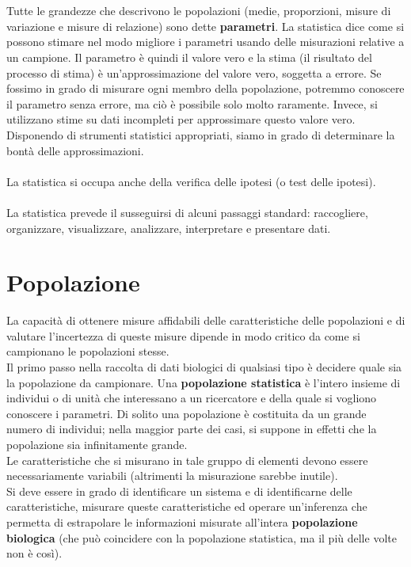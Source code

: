 \documentclass[10pt, draft]{book}
\begin{document}
\\
\\
Tutte le grandezze che descrivono le popolazioni (medie, proporzioni, misure di variazione e misure di relazione) sono dette \textbf{parametri}. La statistica dice come si possono stimare nel modo migliore i parametri usando delle misurazioni relative a un campione. Il parametro è quindi il valore vero e la stima (il risultato del processo di stima) è un'approssimazione del valore vero, soggetta a errore. Se fossimo in grado di misurare ogni membro della popolazione, potremmo conoscere il parametro senza errore, ma ciò è possibile solo molto raramente. Invece, si utilizzano stime su dati incompleti per approssimare questo valore vero. Disponendo di strumenti statistici appropriati, siamo in grado di determinare la bontà delle approssimazioni.
\\
\\
La statistica si occupa anche della verifica delle ipotesi (o test delle ipotesi).
\\
\\
La statistica prevede il susseguirsi di alcuni passaggi standard: raccogliere, organizzare, visualizzare, analizzare, interpretare e presentare dati.

\section{Popolazione}
La capacità di ottenere misure affidabili delle caratteristiche delle popolazioni e di valutare l'incertezza di queste misure dipende in modo critico da come si campionano le popolazioni stesse.
\\
Il primo passo nella raccolta di dati biologici di qualsiasi tipo è decidere quale sia la popolazione da campionare. Una \textbf{popolazione statistica} è l'intero insieme di individui o di unità che interessano a un ricercatore e della quale si vogliono conoscere i parametri. Di solito una popolazione è costituita da un grande numero di individui; nella maggior parte dei casi, si suppone in effetti che la popolazione sia infinitamente grande.
\\
Le caratteristiche che si misurano in tale gruppo di elementi devono essere necessariamente variabili (altrimenti la misurazione sarebbe inutile).
\\
Si deve essere in grado di identificare un sistema e di identificarne delle caratteristiche, misurare queste caratteristiche ed operare un'inferenza che permetta di estrapolare le informazioni misurate all'intera \textbf{popolazione biologica} (che può coincidere con la popolazione statistica, ma il più delle volte non è così).
\end{document}
